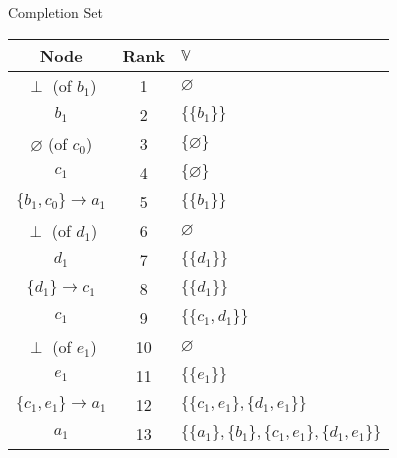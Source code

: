 \documentclass[8pt]{beamer}
\begin{document}
\begin{frame}{Completion Set}
    
    
\vspace{0.5cm}    

\begin{tabular}{|c|c|l|}
 \hline 
 Node & Rank & $\mathbb{V}$ \\ 
 \hline 
 $\perp$ (of $b_1$) & 1 & $\varnothing$ \\ 
 \hline 
 $b_1$ & 2 & $\{\{b_1\}\}$ \pause\\ 
 \hline 
 $\varnothing$ (of $c_0$) & 3 & $\{\varnothing\}$ \\ 
 \hline 
 $c_1$ & 4 & $\{\varnothing\}$ \pause\\ 
 \hline 
 $\{b_1,c_0\}\to a_1$ & 5 & $\{\{b_1\}\}$ \pause\\ 
 \hline 
 $\perp$ (of $d_1$) & 6 & $\varnothing$ \\ 
 \hline 
 $d_1$ & 7 & $\{\{d_1\}\}$ \pause\\ 
 \hline 
 $\{d_1\}\to c_1$ & 8 & $\{\{d_1\}\}$ \\ 
 \hline 
 $c_1$ & 9 & $\{\{c_1, d_1\}\}$ \pause\\ 
 \hline 
 $\perp$ (of $e_1$) & 10 & $\varnothing$ \\ 
 \hline 
 $e_1$ & 11 & $\{\{e_1\}\}$ \pause\\ 
 \hline 
 $\{c_1,e_1\}\to a_1$ & 12 & $\{\{c_1, e_1\}, \{d_1, e_1\}\}$ \pause\\ 
 \hline 
 $a_1$ & 13 & $\{\{a_1\}, \{b_1\}, \{c_1, e_1\}, \{d_1, e_1\}\}$ \\ 
 \hline 
 \end{tabular}
\end{frame} 
 
\end{document}
